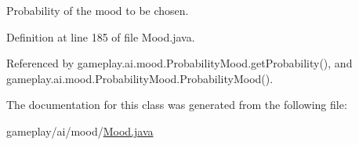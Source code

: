 Probability of the mood to be chosen. 



Definition at line 185 of file Mood.\-java.



Referenced by gameplay.\-ai.\-mood.\-Probability\-Mood.\-get\-Probability(), and gameplay.\-ai.\-mood.\-Probability\-Mood.\-Probability\-Mood().



The documentation for this class was generated from the following file\-:\begin{DoxyCompactItemize}
\item 
gameplay/ai/mood/\hyperlink{_mood_8java}{Mood.\-java}\end{DoxyCompactItemize}
